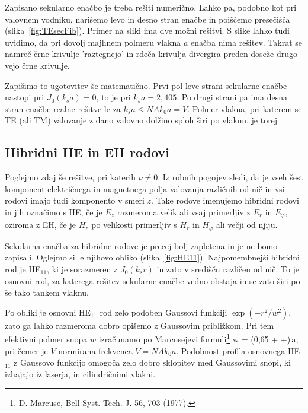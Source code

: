 Zapisano sekularno enačbo je treba rešiti numerično. Lahko pa, podobno kot pri valovnem
vodniku, narišemo levo in desno stran enačbe in poiščemo
presečišča (slika~\ref{fig:TEsecFib}). Primer na sliki ima dve možni rešitvi. S slike lahko 
tudi uvidimo, da pri dovolj majhnem polmeru vlakna $a$ enačba nima rešitev. Takrat se namreč
črne krivulje 'raztegnejo' in rdeča krivulja divergira preden doseže drugo vejo črne krivulje.

Zapišimo to ugotovitev še matematično. Prvi pol leve strani sekularne enačbe nastopi pri 
$J_0 (k_s a)  = 0$, to je pri $k_s a= 2,405$. 
Po drugi strani pa ima desna stran enačbe realne rešitve le za $k_s a \le NA k_0 a = V$.
Polmer vlakna, pri katerem se TE (ali TM) valovanje z dano valovno dolžino sploh širi po 
vlaknu, je torej 

\subsection*{Hibridni HE in EH rodovi}
Poglejmo zdaj še rešitve, pri katerih $\nu \neq 0$. Iz robnih pogojev sledi, da je 
vseh šest komponent električnega in magnetnega polja valovanja različnih od nič in vsi rodovi
imajo tudi komponento v smeri $z$. Take rodove imenujemo hibridni rodovi in jih 
označimo s HE, če je $E_z$ razmeroma velik ali vsaj primerljiv z $E_r$ in $E_\varphi$, 
oziroma z EH, če je $H_z$ po velikosti primerljiv s $H_r$ in $H_\varphi$ ali večji od njiju. 

Sekularna enačba za hibridne rodove je precej bolj zapletena in je ne bomo zapisali. 
Oglejmo si le njihovo obliko (slika~\ref{fig:HE11}). Najpomembnejši hibridni rod je HE$_{11}$, 
ki je sorazmeren z $J_0(k_sr)$ in zato v središču različen od nič. 
To je osnovni rod, za katerega rešitev sekularne enačbe vedno obstaja in se
zato širi po še tako tankem vlaknu. 

Po obliki je osnovni HE$_{11}$ rod zelo podoben Gaussovi funkciji $\exp(-r^2/w^2)$,
zato ga lahko razmeroma dobro opišemo z Gaussovim približkom. 
Pri tem efektivni polmer snopa
$w$ izračunamo po Marcusejevi formuli\footnote{D. Marcuse, Bell Syst. Tech. J. 56, 703 (1977).}
\beq 
w = (0,65 + +)\,a,
\eeq
pri čemer je $V$ normirana frekvenca $V = NA k_0 a$. Podobnost profila osnovnega
HE$_{11}$ z Gaussovo funkcijo omogoča zelo dobro sklopitev med Gaussovimi
snopi, ki izhajajo iz laserja, in cilindričnimi vlakni.

